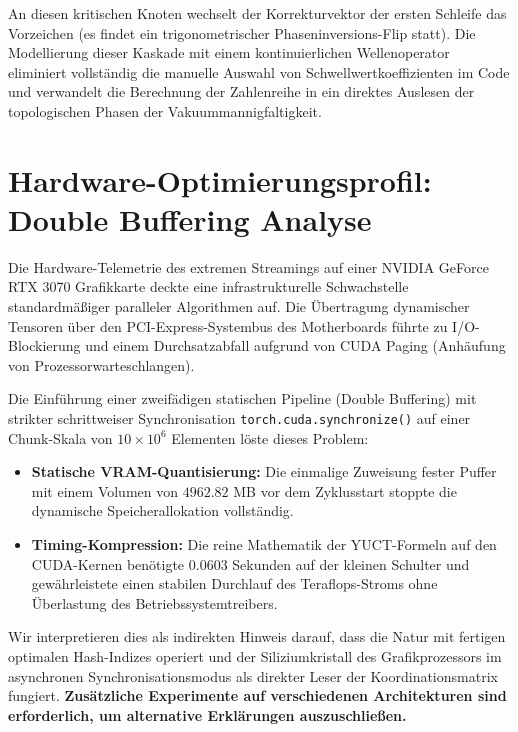 \documentclass[11pt,a4paper]{article}
\begin{document}
	An diesen kritischen Knoten wechselt der Korrekturvektor der ersten Schleife das Vorzeichen (es findet ein trigonometrischer Phaseninversions-Flip statt). Die Modellierung dieser Kaskade mit einem kontinuierlichen Wellenoperator eliminiert vollständig die manuelle Auswahl von Schwellwertkoeffizienten im Code und verwandelt die Berechnung der Zahlenreihe in ein direktes Auslesen der topologischen Phasen der Vakuummannigfaltigkeit.
	
	\section{Hardware-Optimierungsprofil: Double Buffering Analyse}
	Die Hardware-Telemetrie des extremen Streamings auf einer NVIDIA GeForce RTX 3070 Grafikkarte deckte eine infrastrukturelle Schwachstelle standardmäßiger paralleler Algorithmen auf. Die Übertragung dynamischer Tensoren über den PCI-Express-Systembus des Motherboards führte zu I/O-Blockierung und einem Durchsatzabfall aufgrund von CUDA Paging (Anhäufung von Prozessorwarteschlangen).
	
	Die Einführung einer zweifädigen statischen Pipeline (Double Buffering) mit strikter schrittweiser Synchronisation \texttt{torch.cuda.synchronize()} auf einer Chunk-Skala von $10 \times 10^6$ Elementen löste dieses Problem:
	\begin{itemize}
		\item \textbf{Statische VRAM-Quantisierung:} Die einmalige Zuweisung fester Puffer mit einem Volumen von $4962.82$ MB vor dem Zyklusstart stoppte die dynamische Speicherallokation vollständig.
		\item \textbf{Timing-Kompression:} Die reine Mathematik der YUCT-Formeln auf den CUDA-Kernen benötigte $0.0603$ Sekunden auf der kleinen Schulter und gewährleistete einen stabilen Durchlauf des Teraflops-Stroms ohne Überlastung des Betriebssystemtreibers.
	\end{itemize}
	Wir interpretieren dies als indirekten Hinweis darauf, dass die Natur mit fertigen optimalen Hash-Indizes operiert und der Siliziumkristall des Grafikprozessors im asynchronen Synchronisationsmodus als direkter Leser der Koordinationsmatrix fungiert. \textbf{Zusätzliche Experimente auf verschiedenen Architekturen sind erforderlich, um alternative Erklärungen auszuschließen.}
	
\end{document}
